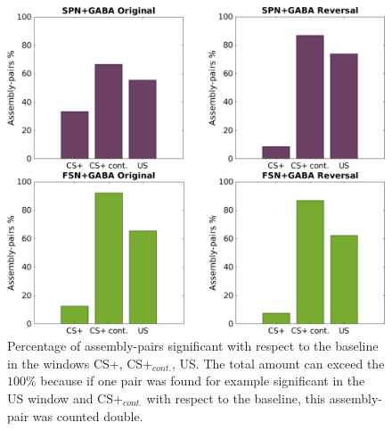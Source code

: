 \begin{figure}
    \centering
    \includegraphics[scale=0.36]{figures/SPN_GABAHisto.pdf}
    
    \vspace{1cm}
    
    \includegraphics[scale=0.36]{figures/FSN_GABAHisto.pdf}
    \caption{Percentage of assembly-pairs significant with respect to the baseline in the windows CS+, CS+$_{cont.}$, US. The total amount can exceed the $100\%$ because if one pair was found for example significant in the US window and CS+$_{cont.}$ with respect to the baseline, this assembly-pair was counted double.}
    \label{fig:FriedHistoGABA}
\end{figure}\\
\pagebreak
